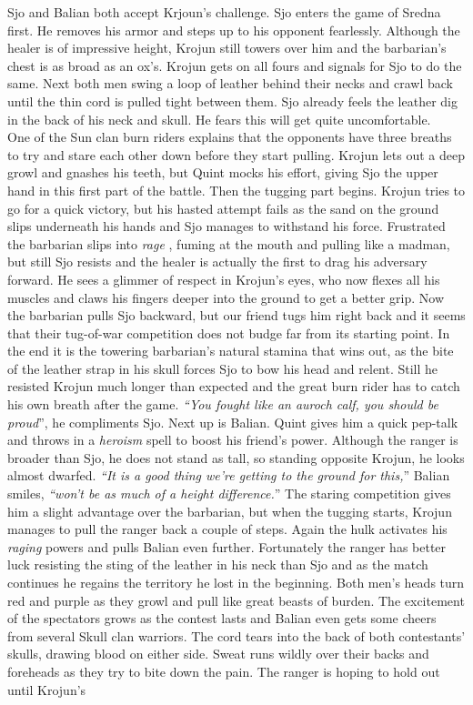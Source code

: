 Sjo and Balian both accept Krjoun's challenge. Sjo enters the game of Sredna first. He removes his armor and steps up to his opponent fearlessly. Although the healer is of impressive height, Krojun still towers over him and the barbarian's chest is as broad as an ox's. Krojun gets on all fours and signals for Sjo to do the same. Next both men swing a loop of leather behind their necks and crawl back until the thin cord is pulled tight between them. Sjo already feels the leather dig in the back of his neck and skull. He fears this will get quite uncomfortable.\\

One of the Sun clan burn riders explains that the opponents have three breaths to try and stare each other down before they start pulling. Krojun lets out a deep growl and gnashes his teeth, but Quint mocks his effort, giving Sjo the upper hand in this first part of the battle. Then the tugging part begins. Krojun tries to go for a quick victory, but his hasted attempt fails as the sand on the ground slips underneath his hands and Sjo manages to withstand his force. Frustrated the barbarian slips into {\itshape rage} , fuming at the mouth and pulling like a madman, but still Sjo resists and the healer is actually the first to drag his adversary forward. He sees a glimmer of respect in Krojun's eyes, who now flexes all his muscles and claws his fingers deeper into the ground to get a better grip. Now the barbarian pulls Sjo backward, but our friend tugs him right back and it seems that their tug-of-war competition does not budge far from its starting point. In the end it is the towering barbarian's natural stamina that wins out, as the bite of the leather strap in his skull forces Sjo to bow his head and relent. Still he resisted Krojun much longer than expected and the great burn rider has to catch his own breath after the game. {\itshape``You fought like an auroch calf, you should be proud}'', he compliments Sjo. Next up is Balian. Quint gives him a quick pep-talk and throws in a {\itshape heroism} spell to boost his friend's power. Although the ranger is broader than Sjo, he does not stand as tall, so standing opposite Krojun, he looks almost dwarfed. {\itshape``It is a good thing we're getting to the ground for this,}'' Balian smiles, {\itshape``won't be as much of a height difference.}'' The staring competition gives him a slight advantage over the barbarian, but when the tugging starts, Krojun manages to pull the ranger back a couple of steps. Again the hulk activates his  {\itshape raging} powers and pulls Balian even further. Fortunately the ranger has better luck resisting the sting of the leather in his neck than Sjo and as the match continues he regains the territory he lost in the beginning. Both men's heads turn red and purple as they growl and pull like great beasts of burden. The excitement of the spectators grows as the contest lasts and Balian even gets some cheers from several Skull clan warriors. The cord tears into the back of both contestants' skulls, drawing blood on either side. Sweat runs wildly over their backs and foreheads as they try to bite down the pain. The ranger is hoping to hold out until Krojun's  